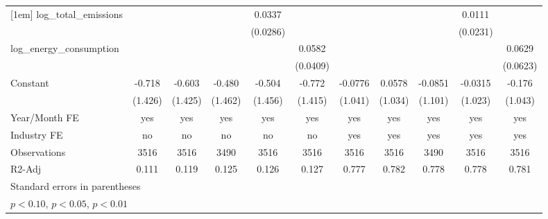 \begin{table}[htbp]
\begin{tabular}{l*{10}{c}}
[1em]
log\_total\_emissions &                     &                     &                     &      0.0337         &                     &                     &                     &                     &      0.0111         &                     \\
                    &                     &                     &                     &    (0.0286)         &                     &                     &                     &                     &    (0.0231)         &                     \\
[1em]
log\_energy\_consumption&                     &                     &                     &                     &      0.0582         &                     &                     &                     &                     &      0.0629         \\
                    &                     &                     &                     &                     &    (0.0409)         &                     &                     &                     &                     &    (0.0623)         \\
[1em]
Constant            &      -0.718         &      -0.603         &      -0.480         &      -0.504         &      -0.772         &     -0.0776         &      0.0578         &     -0.0851         &     -0.0315         &      -0.176         \\
                    &     (1.426)         &     (1.425)         &     (1.462)         &     (1.456)         &     (1.415)         &     (1.041)         &     (1.034)         &     (1.101)         &     (1.023)         &     (1.043)         \\
\hline
Year/Month FE       &         yes         &         yes         &         yes         &         yes         &         yes         &         yes         &         yes         &         yes         &         yes         &         yes         \\
Industry FE         &          no         &          no         &          no         &          no         &          no         &         yes         &         yes         &         yes         &         yes         &         yes         \\
Observations        &        3516         &        3516         &        3490         &        3516         &        3516         &        3516         &        3516         &        3490         &        3516         &        3516         \\
R2-Adj              &       0.111         &       0.119         &       0.125         &       0.126         &       0.127         &       0.777         &       0.782         &       0.778         &       0.778         &       0.781         \\
\hline\hline
\multicolumn{11}{l}{\footnotesize Standard errors in parentheses}\\
\multicolumn{11}{l}{\footnotesize \sym{*} \(p<0.10\), \sym{**} \(p<0.05\), \sym{***} \(p<0.01\)}\\
\end{tabular}
\end{table}
